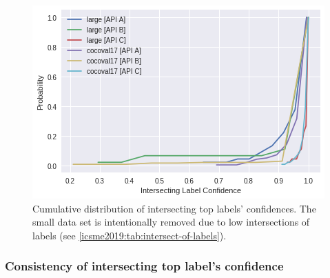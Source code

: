\begin{table}[t!]
\caption[Evolution of top labels and confidence values]{Ratio of the top labels (to images) that remained the top label but changed confidence values between intervals.}
\label{icsme2019:tab:delta-confidences}
\centering
{}
\end{table}


\begin{figure}
  \centering
  \includegraphics[width=0.75\linewidth]{intersecting-cdf}
  \caption[Cumulative distribution of intersecting top label confidences]{Cumulative distribution of intersecting top labels' confidences. The small data set is intentionally removed due to low intersections of labels (see \cref{icsme2019:tab:intersect-of-labels}).}
  \label{icsme2019:fig:intersecting-cdf}
\end{figure}

\subsubsection{Consistency of intersecting top label's confidence}

